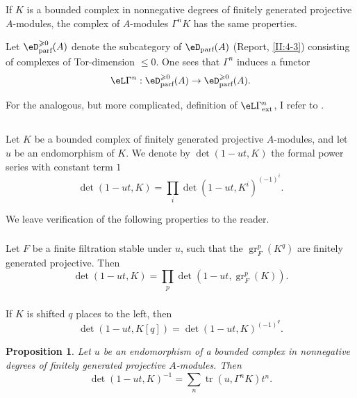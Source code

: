 \documentclass[12pt,oneside,english]{smfbook}
\DeclareMathOperator{\gr}{gr}
\DeclareMathOperator{\tr}{tr}
\newtheorem{proposition_}[subsection]{Proposition}
\begin{document}
If $K$ is a bounded complex in nonnegative degrees of finitely generated projective $A$-modules, the complex of $A$-modules $\Gamma^nK$ has the same properties.

Let $\eD_\text{parf}^{\geqslant 0}(A)$ denote the subcategory of $\eD_\text{parf}(A)$ (Report, \ref{II:4-3}) consisting of complexes of Tor-dimension $\leqslant0$. One sees that $\Gamma^n$ induces a functor
\[
  \eL\Gamma^n : \eD_\text{parf}^{\geqslant 0}(A) \to \eD_\text{parf}^{\geqslant 0}(A) \text{.}
\]

For the analogous, but more complicated, definition of $\eL\Gamma_\text{ext}^n$, I refer to \cite[XVII 5.5.14]{sga4}.

\subsection{}\label{III:1-7}

Let $K$ be a bounded complex of finitely generated projective $A$-modules, and let $u$ be an endomorphism of $K$. We denote by $\det(1-ut,K)$ the formal power series with constant term $1$
\[
  \det(1-u t,K) = \prod_i \det(1-u t,K^i)^{(-1)^i} \text{.}
\]

We leave verification of the following properties to the reader.

\subsubsection{}\label{III:1-7-1}

Let $F$ be a finite filtration stable under $u$, such that the $\gr_F^p(K^q)$ are finitely generated projective. Then
\[
  \det(1-u t,K) = \prod_p \det(1-u t,\gr_F^p(K)) \text{.}
\]

\subsubsection{}\label{III:1-7-2}

If $K$ is shifted $q$ places to the left, then
\[
  \det(1-u t,K[q]) = \det(1-u t,K)^{(-1)^q} \text{.}
\]

\begin{proposition_}\label{III:1-8}
Let $u$ be an endomorphism of a bounded complex in nonnegative degrees of finitely generated projective $A$-modules. Then
\begin{equation*}\tag{1.8.1}\label{III:eq:1-8-1}
  \det(1-u t,K)^{-1} = \sum_n \tr(u,\Gamma^n K) t^n \text{.}
\end{equation*}
\end{proposition_}
\end{document}
